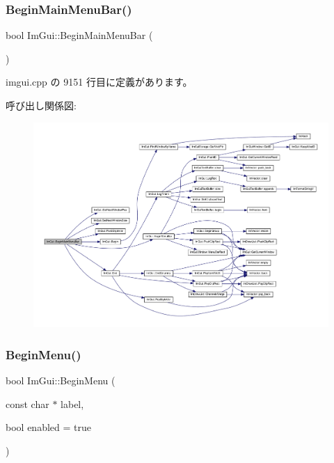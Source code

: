 \subsubsection{\texorpdfstring{Begin\+Main\+Menu\+Bar()}{BeginMainMenuBar()}}
{\footnotesize\ttfamily bool Im\+Gui\+::\+Begin\+Main\+Menu\+Bar (\begin{DoxyParamCaption}{ }\end{DoxyParamCaption})}



 imgui.\+cpp の 9151 行目に定義があります。

呼び出し関係図\+:\nopagebreak
\begin{figure}[H]
\begin{center}
\leavevmode
\includegraphics[width=350pt]{namespace_im_gui_a55cb9cfb9865204ac6fb21c965784f78_cgraph}
\end{center}
\end{figure}
\mbox{\label{namespace_im_gui_a1e55711a21f97d5dff919d697d3a7201}} 
\subsubsection{\texorpdfstring{Begin\+Menu()}{BeginMenu()}}
{\footnotesize\ttfamily bool Im\+Gui\+::\+Begin\+Menu (\begin{DoxyParamCaption}\item[{const char $\ast$}]{label,  }\item[{bool}]{enabled = {\ttfamily true} }\end{DoxyParamCaption})}



